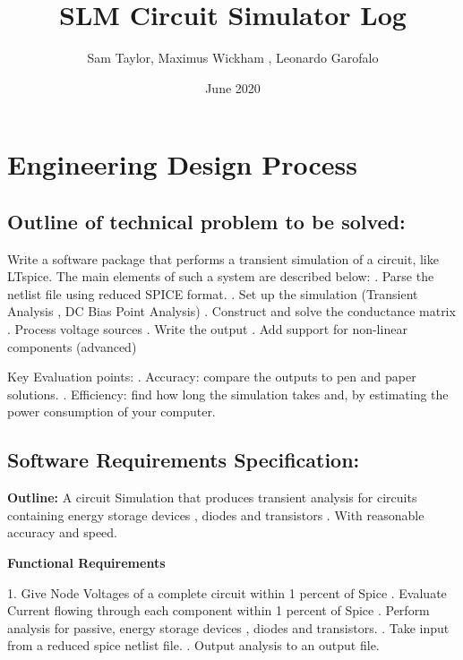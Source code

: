 \documentclass{article}
\title{SLM Circuit Simulator Log}
\author{Sam Taylor, Maximus Wickham , Leonardo Garofalo}
\date{June 2020}
\begin{document}
\maketitle
\newpage
\tableofcontents
\newpage

\section{Engineering Design Process}
\flushleft

\subsection{Outline of technical problem to be solved:}
\flushleft

\smallbreak
Write a software package that performs a transient simulation of a circuit, like LTspice. The main elements of such a system are described below:
\newline
{}. Parse the netlist file using reduced SPICE format.
. Set up the simulation (Transient Analysis , DC Bias Point Analysis)
. Construct and solve the conductance matrix
. Process voltage sources
. Write the output
. Add support for non-linear components (advanced)
\newline
\mediumbreak 

Key Evaluation points:
. Accuracy: compare the outputs to pen and paper solutions. 
. Efficiency: find how long the simulation takes and, by estimating the power consumption of your computer.

\subsection{Software Requirements Specification:}
\flushleft
\textbf{Outline:} A circuit Simulation that produces transient analysis for circuits containing energy storage devices , diodes and transistors . With reasonable accuracy and speed.

\bigbreak

\textbf{Functional Requirements}

\newline

1. Give Node Voltages of a complete circuit within 1 percent of Spice
. Evaluate Current flowing through each component within 1 percent of Spice
. Perform analysis for passive, energy storage devices , diodes and transistors.
. Take input from a reduced spice netlist file.
. Output analysis to an output file.
\end{document}
